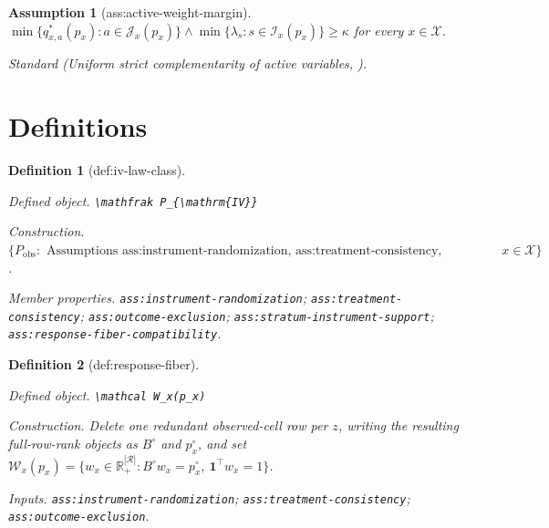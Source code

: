 \documentclass{article}
\newtheorem{assumption}{Assumption}
\newtheorem{definition}{Definition}
\begin{document}
\begin{assumption}[ass:active-weight-margin]\label{ass:active-weight-margin}
\(\min\{q_{x,a}^*(p_x):a\in\mathcal J_x(p_x)\}\wedge\min\{\lambda_s:s\in\mathcal I_x(p_x)\}\geq\kappa\) for every \(x\in\mathcal X\).
\par\smallskip\noindent\emph{Standard} (Uniform strict complementarity of active variables, \cite{BonnansShapiro2000Perturbation}).
\end{assumption}

\section{Definitions}

\begin{definition}[def:iv-law-class]\label{def:iv-law-class}
\par\smallskip\noindent\emph{Defined object.} \texttt{\textbackslash{}\allowbreak{}mathfrak P\_\allowbreak{}\{\textbackslash{}\allowbreak{}mathrm\{IV\}\allowbreak{}\}\allowbreak{}}
\par\smallskip\noindent\emph{Construction.} \(\{P_{\mathrm{obs}}:\text{ Assumptions ass:instrument-randomization, ass:treatment-consistency, ass:outcome-exclusion, ass:stratum-instrument-support, and ass:response-fiber-compatibility hold for every }x\in\mathcal X\}\).
\par\smallskip\noindent\emph{Member properties.} \texttt{ass:\allowbreak{}instrument-\allowbreak{}randomization}; \texttt{ass:\allowbreak{}treatment-\allowbreak{}consistency}; \texttt{ass:\allowbreak{}outcome-\allowbreak{}exclusion}; \texttt{ass:\allowbreak{}stratum-\allowbreak{}instrument-\allowbreak{}support}; \texttt{ass:\allowbreak{}response-\allowbreak{}fiber-\allowbreak{}compatibility}.
\end{definition}

\begin{definition}[def:response-fiber]\label{def:response-fiber}
\par\smallskip\noindent\emph{Defined object.} \texttt{\textbackslash{}\allowbreak{}mathcal W\_\allowbreak{}x(p\_\allowbreak{}x)}
\par\smallskip\noindent\emph{Construction.} Delete one redundant observed-cell row per \(z\), writing the resulting full-row-rank objects as \(B^\circ\) and \(p_x^\circ\), and set \(\mathcal W_x(p_x)=\{w_x\in\mathbb R_+^{|\mathcal R|}:B^\circ w_x=p_x^\circ,\ \mathbf 1^\top w_x=1\}\).
\par\smallskip\noindent\emph{Inputs.} \texttt{ass:\allowbreak{}instrument-\allowbreak{}randomization}; \texttt{ass:\allowbreak{}treatment-\allowbreak{}consistency}; \texttt{ass:\allowbreak{}outcome-\allowbreak{}exclusion}.
\end{definition}
\end{document}
